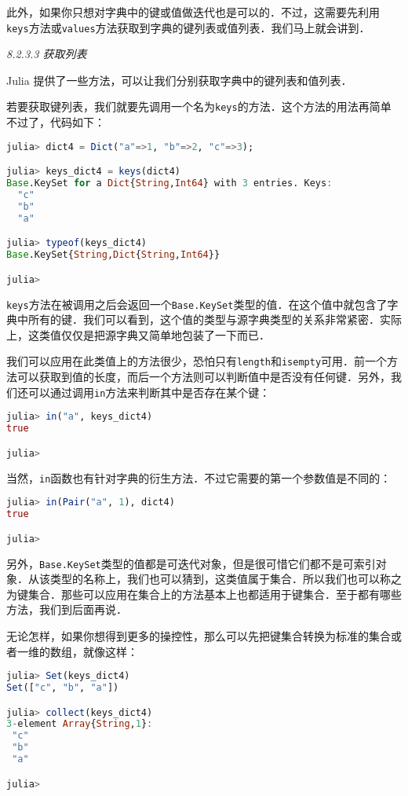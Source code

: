 此外，如果你只想对字典中的键或值做迭代也是可以的．不过，这需要先利用\verb|keys|方法或\verb|values|方法获取到字典的键列表或值列表．我们马上就会讲到．

\textsl{8.2.3.3 获取列表}

Julia 提供了一些方法，可以让我们分别获取字典中的键列表和值列表．

若要获取键列表，我们就要先调用一个名为\verb|keys|的方法．这个方法的用法再简单不过了，代码如下：
\begin{lstlisting}[language=julia]
julia> dict4 = Dict("a"=>1, "b"=>2, "c"=>3);

julia> keys_dict4 = keys(dict4)
Base.KeySet for a Dict{String,Int64} with 3 entries. Keys:
  "c"
  "b"
  "a"

julia> typeof(keys_dict4)
Base.KeySet{String,Dict{String,Int64}}

julia> 
\end{lstlisting}

\verb|keys|方法在被调用之后会返回一个\verb|Base.KeySet|类型的值．在这个值中就包含了字典中所有的键．我们可以看到，这个值的类型与源字典类型的关系非常紧密．实际上，这类值仅仅是把源字典又简单地包装了一下而已．

我们可以应用在此类值上的方法很少，恐怕只有\verb|length|和\verb|isempty|可用．前一个方法可以获取到值的长度，而后一个方法则可以判断值中是否没有任何键．另外，我们还可以通过调用\verb|in|方法来判断其中是否存在某个键：
\begin{lstlisting}[language=julia]
julia> in("a", keys_dict4)
true

julia> 
\end{lstlisting}

当然，\verb|in|函数也有针对字典的衍生方法．不过它需要的第一个参数值是不同的：
\begin{lstlisting}[language=julia]
julia> in(Pair("a", 1), dict4)
true

julia> 
\end{lstlisting}

另外，\verb|Base.KeySet|类型的值都是可迭代对象，但是很可惜它们都不是可索引对象．从该类型的名称上，我们也可以猜到，这类值属于集合．所以我们也可以称之为键集合．那些可以应用在集合上的方法基本上也都适用于键集合．至于都有哪些方法，我们到后面再说．

无论怎样，如果你想得到更多的操控性，那么可以先把键集合转换为标准的集合或者一维的数组，就像这样：
\begin{lstlisting}[language=julia]
julia> Set(keys_dict4)
Set(["c", "b", "a"])

julia> collect(keys_dict4)
3-element Array{String,1}:
 "c"
 "b"
 "a"

julia> 
\end{lstlisting}

